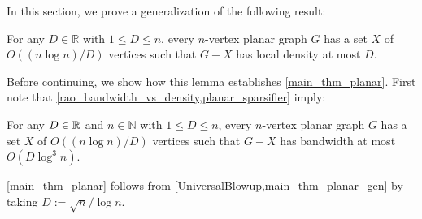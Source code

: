 \documentclass{patmorin}
\renewcommand{\le}{\leqslant}
\renewcommand{\leq}{\leqslant}
\newcommand{\NN}{\mathbb{N}}
\begin{document}
In this section, we prove a generalization of the following result:

\begin{lem}\label{planar_sparsifier}
  For any $D\in\mathbb{R}$ with $1\leq D\leq n$, every $n$-vertex planar graph $G$ has a set $X$ of $O((n\log n)/D)$ vertices such that $G-X$ has local density at most $D$.
\end{lem}


Before continuing, we show how this lemma establishes \cref{main_thm_planar}. First note that
\cref{rao_bandwidth_vs_density,planar_sparsifier} imply:

\begin{cor}
\label{main_thm_planar_gen}
    For any $D\in\mathbb{R}$ and $n\in\NN$ with $1\leq D\leq n$, every $n$-vertex planar graph $G$ has a set $X$ of $O((n\log n)/D)$ vertices such that $G-X$ has bandwidth at most $O(D\log^3 n)$.
\end{cor}

\cref{main_thm_planar} follows from \cref{UniversalBlowup,main_thm_planar_gen}  by taking $D:=\sqrt{n}/\log n$.


%
%
%

\end{document}

